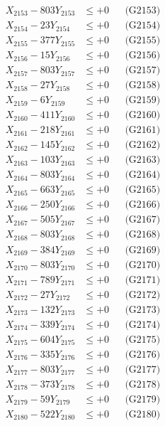 \documentclass[a4paper,10pt]{article}
\begin{document}
{\begin{align}
X_{2153} - 803Y_{2153} &\leq +0 && \text{(G2153)} \\
X_{2154} - 23Y_{2154} &\leq +0 && \text{(G2154)} \\
X_{2155} - 377Y_{2155} &\leq +0 && \text{(G2155)} \\
X_{2156} - 15Y_{2156} &\leq +0 && \text{(G2156)} \\
X_{2157} - 803Y_{2157} &\leq +0 && \text{(G2157)} \\
X_{2158} - 27Y_{2158} &\leq +0 && \text{(G2158)} \\
X_{2159} - 6Y_{2159} &\leq +0 && \text{(G2159)} \\
X_{2160} - 411Y_{2160} &\leq +0 && \text{(G2160)} \\
\allowbreak
X_{2161} - 218Y_{2161} &\leq +0 && \text{(G2161)} \\
X_{2162} - 145Y_{2162} &\leq +0 && \text{(G2162)} \\
X_{2163} - 103Y_{2163} &\leq +0 && \text{(G2163)} \\
X_{2164} - 803Y_{2164} &\leq +0 && \text{(G2164)} \\
X_{2165} - 663Y_{2165} &\leq +0 && \text{(G2165)} \\
X_{2166} - 250Y_{2166} &\leq +0 && \text{(G2166)} \\
X_{2167} - 505Y_{2167} &\leq +0 && \text{(G2167)} \\
X_{2168} - 803Y_{2168} &\leq +0 && \text{(G2168)} \\
X_{2169} - 384Y_{2169} &\leq +0 && \text{(G2169)} \\
X_{2170} - 803Y_{2170} &\leq +0 && \text{(G2170)} \\
\allowbreak
X_{2171} - 789Y_{2171} &\leq +0 && \text{(G2171)} \\
X_{2172} - 27Y_{2172} &\leq +0 && \text{(G2172)} \\
X_{2173} - 132Y_{2173} &\leq +0 && \text{(G2173)} \\
X_{2174} - 339Y_{2174} &\leq +0 && \text{(G2174)} \\
X_{2175} - 604Y_{2175} &\leq +0 && \text{(G2175)} \\
X_{2176} - 335Y_{2176} &\leq +0 && \text{(G2176)} \\
X_{2177} - 803Y_{2177} &\leq +0 && \text{(G2177)} \\
X_{2178} - 373Y_{2178} &\leq +0 && \text{(G2178)} \\
X_{2179} - 59Y_{2179} &\leq +0 && \text{(G2179)} \\
X_{2180} - 522Y_{2180} &\leq +0 && \text{(G2180)} \\

\end{align}}
\end{document}
